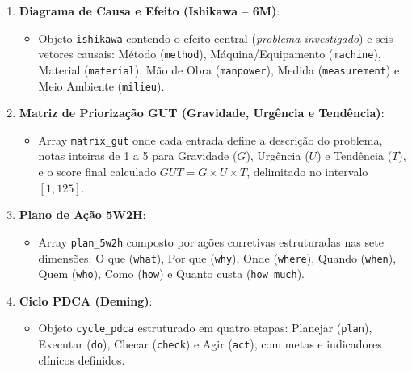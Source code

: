 \begin{enumerate}
    \item \textbf{Diagrama de Causa e Efeito (Ishikawa -- 6M)}:
    \begin{itemize}
        \item Objeto \texttt{ishikawa} contendo o efeito central (\textit{problema investigado}) e seis vetores causais: Método (\texttt{method}), Máquina/Equipamento (\texttt{machine}), Material (\texttt{material}), Mão de Obra (\texttt{manpower}), Medida (\texttt{measurement}) e Meio Ambiente (\texttt{milieu}).
    \end{itemize}

    \item \textbf{Matriz de Priorização GUT (Gravidade, Urgência e Tendência)}:
    \begin{itemize}
        \item Array \texttt{matrix\_gut} onde cada entrada define a descrição do problema, notas inteiras de 1 a 5 para Gravidade ($G$), Urgência ($U$) e Tendência ($T$), e o score final calculado $GUT = G \times U \times T$, delimitado no intervalo $[1, 125]$.
    \end{itemize}

    \item \textbf{Plano de Ação 5W2H}:
    \begin{itemize}
        \item Array \texttt{plan\_5w2h} composto por ações corretivas estruturadas nas sete dimensões: O que (\texttt{what}), Por que (\texttt{why}), Onde (\texttt{where}), Quando (\texttt{when}), Quem (\texttt{who}), Como (\texttt{how}) e Quanto custa (\texttt{how\_much}).
    \end{itemize}

    \item \textbf{Ciclo PDCA (Deming)}:
    \begin{itemize}
        \item Objeto \texttt{cycle\_pdca} estruturado em quatro etapas: Planejar (\texttt{plan}), Executar (\texttt{do}), Checar (\texttt{check}) e Agir (\texttt{act}), com metas e indicadores clínicos definidos.
    \end{itemize}
\end{enumerate}
